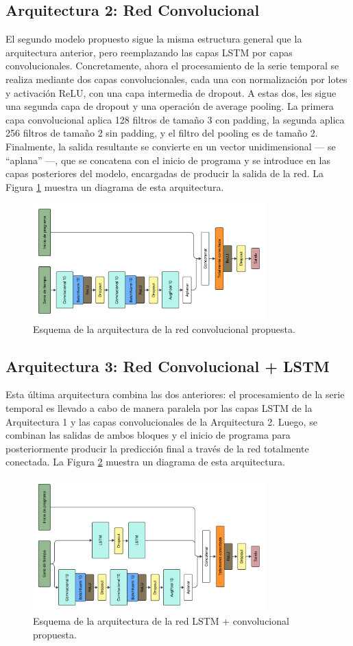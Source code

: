 \documentclass[../../main.tex]{subfiles}
\begin{document}
\subsection{Arquitectura 2: Red Convolucional}
El segundo modelo propuesto sigue la misma estructura general que la arquitectura
anterior, pero reemplazando las capas LSTM por capas convolucionales. Concretamente, ahora
el procesamiento de la serie temporal se realiza mediante dos capas convolucionales, cada
una con normalización por lotes y activación ReLU, con una capa intermedia de dropout. A
estas dos, les sigue una segunda capa de dropout y una operación de average pooling. La
primera capa convolucional aplica 128 filtros de tamaño 3 con padding, la segunda aplica
256 filtros de tamaño 2 sin padding, y el filtro del pooling es de tamaño 2. Finalmente,
la salida resultante se convierte en un vector unidimensional — se ``aplana'' —, que se
concatena con el inicio de programa y se introduce en las capas posteriores del modelo,
encargadas de producir la salida de la red. La Figura \ref{fig:conv} muestra un diagrama
de esta arquitectura.
\begin{figure}[ht]
    \centering
    \includegraphics[width=0.8\textwidth]{figs/conv.png}
    \caption{Esquema de la arquitectura de la red convolucional propuesta.}
    \label{fig:conv}
\end{figure}

\subsection{Arquitectura 3: Red Convolucional + LSTM}
Esta última arquitectura combina las dos anteriores: el procesamiento de la serie temporal
es llevado a cabo de manera paralela por las capas LSTM de la Arquitectura 1 y las capas
convolucionales de la Arquitectura 2. Luego, se combinan las salidas de ambos bloques y el
inicio de programa para posteriormente producir la predicción final a través de la red
totalmente conectada. La Figura \ref{fig:lstm_v2_conv} muestra un diagrama de esta
arquitectura.

\begin{figure}[ht]
    \centering
    \includegraphics[width=0.8\textwidth]{figs/lstm_conv.png}
    \caption{Esquema de la arquitectura de la red LSTM + convolucional propuesta.}
    \label{fig:lstm_v2_conv}
\end{figure}
\end{document}
